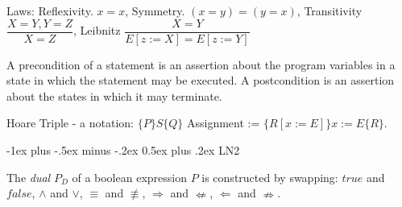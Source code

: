 \documentclass[letterpaper, 8pt]{extarticle}
\makeatletter
\renewcommand{\section}{\@startsection{section}{1}{0mm}%
                                {-1ex plus -.5ex minus -.2ex}%
                                {0.5ex plus .2ex}%
                                {\normalfont\normalsize\bfseries}}
\makeatother
\begin{document}
\begin{multicols*}{3}
    Laws: Reflexivity. $x=x$, Symmetry. $(x = y) = (y= x)$, Transitivity $\dfrac{X=Y, Y = Z}{X =Z}$, Leibnitz $\dfrac{X=Y}{E[z := X]=E[z := Y]}$

    A precondition of a statement is an assertion about the
    program variables in a state in which the statement may be
    executed. A postcondition is an assertion about the states in which it
    may terminate.

    Hoare Triple - a notation: $\{P\} S \{Q\}$
    Assignment := $\{R[x := E]\} x := E \{R\}$.

    \section{LN2}

    The \textit{dual} $P_D$ of a boolean expression $P$ is constructed by swapping:
    $true$ and $false$,
    $\land$ and $\lor$,
    $\equiv$ and $\not\equiv$,
    $\Rightarrow$ and $\nLeftarrow$,
    $\Leftarrow$ and $\nRightarrow$.


\end{multicols*}
\end{document}
